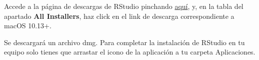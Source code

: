 \documentclass[spanish,]{article}
\begin{document}
Accede a la página de descargas de RStudio pinchando \href{https://rstudio.com/products/rstudio/download/\#download}{aquí}, y, en la tabla del apartado \textbf{All Installers}, haz click en el link de descarga correspondiente a macOS 10.13+.

Se descargará un archivo dmg. Para completar la instalación de RStudio en tu equipo solo tienes que arrastar el icono de la aplicación a tu carpeta Aplicaciones.



\end{document}
